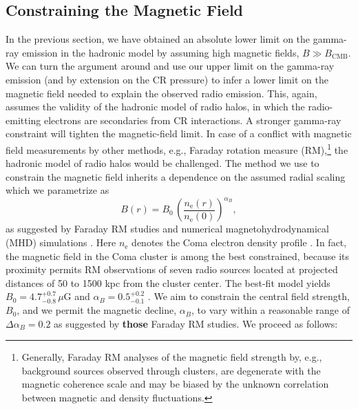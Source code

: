 \documentclass[12pt,manuscript]{aastex}
\newcommand{\rmn}{\mathrm}
\begin{document}
\subsection{Constraining the Magnetic Field}
\label{sec:B}
In the previous section, we have obtained an absolute lower limit on the gamma-ray emission in
the hadronic model by assuming high magnetic fields, $B\gg B_\rmn{CMB}$. We can turn the
argument around and use our upper limit on the gamma-ray emission (and by extension on the
CR pressure) to infer a lower limit on the magnetic field needed to explain the observed radio
emission. This, again, assumes the validity of the hadronic model of radio halos, in which the
radio-emitting electrons are secondaries from CR interactions. A stronger gamma-ray
constraint will tighten the magnetic-field limit. In case of a conflict with magnetic field
measurements by other methods, e.g., Faraday rotation measure (RM),\footnote{Generally,
Faraday RM analyses of the magnetic field strength by, e.g., background sources observed through
clusters, are degenerate with the magnetic coherence scale and may be biased by the unknown
correlation between magnetic and density fluctuations.} the hadronic model of radio halos would
be challenged. The method we use to constrain the magnetic field inherits a dependence on
the assumed radial scaling which we parametrize as
\begin{equation}
\label{eq:B}
B(r) = B_{0} \,\left(\frac{n_{\rmn{e}}(r)}{n_{\rmn{e}}(0)}\right)^{\alpha_B},
\end{equation}
as suggested by Faraday RM studies and numerical magnetohydrodynamical (MHD) simulations
\citep[][and references therein]{article:Bonafede_etal:2010, article:Bonafede_etal:2011}. Here
$n_{\rmn{e}}$ denotes the Coma electron density profile \citep{article:BrielHenryBohringer:1992}.
In fact, the magnetic field in the Coma cluster is among the best constrained, because its proximity
permits RM observations of seven radio sources located at projected distances of 50 to 1500 kpc from
the cluster center. The best-fit model yields $B_{0} = 4.7^{+0.7}_{-0.8}\,\mu$G and $\alpha_{B} =
0.5^{+0.2}_{-0.1}$ \citep{article:Bonafede_etal:2010}. We aim to constrain the central field
strength, $B_{0}$, and we permit the magnetic decline, $\alpha_{B}$, to vary within a reasonable
range of $\Delta\alpha_{B}=0.2$ as suggested by {\bf those} Faraday RM studies. We proceed as follows:
\end{document}
